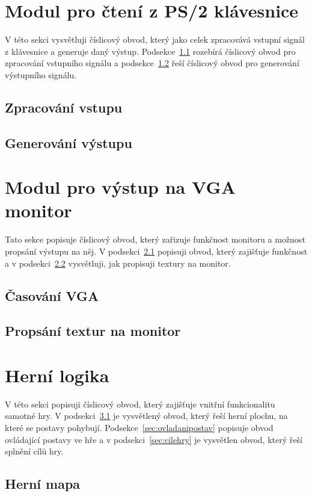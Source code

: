 \documentclass{report}
\begin{document}
\section{Modul pro čtení z PS/2 klávesnice}\label{sec:ctenizps2}
V této sekci vysvětluji číslicový obvod, který jako celek zpracovává vstupní signál z klávesnice a generuje daný výstup. Podsekce~\ref{sec:zpracovanivstupu} rozebírá číslicový obvod pro zpracování vstupního signálu a podsekce~\ref{sec:generovanivystupu} řeší číslicový obvod pro generování výstupního signálu.
\subsection{Zpracování vstupu}\label{sec:zpracovanivstupu}
\subsection{Generování výstupu}\label{sec:generovanivystupu}

\section{Modul pro výstup na VGA monitor}\label{sec:vystupnavga}
Tato sekce popisuje číslicový obvod, který zařizuje funkčnost monitoru a možnost propsání výstupu na něj. V podsekci~\ref{sec:casovanivga} popisuji obvod, který zajišťuje funkčnost a v podsekci~\ref{sec:propsanitextur} vysvětluji, jak propisuji textury na monitor.
\subsection{Časování VGA}\label{sec:casovanivga}
\subsection{Propsání textur na monitor}\label{sec:propsanitextur}

\section{Herní logika}\label{sec:hernilogika}
V této sekci popisuji číslicový obvod, který zajišťuje vnitřní funkcionalitu samotné hry. V podsekci~\ref{sec:hernimapa} je vysvětlený obvod, který řeší herní plochu, na které se postavy pohybují. Podsekce~\ref{sec:ovladanipostav} popisuje obvod ovládající postavy ve hře a v podsekci~\ref{sec:cilehry} je vysvětlen obvod, který řeší splnění cílů hry.
\subsection{Herní mapa}\label{sec:hernimapa}
\end{document}
